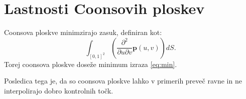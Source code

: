 \documentclass[a4paper,12pt]{article}
\begin{document}

\section{Lastnosti Coonsovih ploskev}

Coonsova ploskve minimzirajo zasuk, definiran kot:
\begin{equation}
   \label{eq:min}
   \int_{[0,1]^2} \left( \frac{\partial^2}{\partial u \partial v}\mathbf{p}(u,v) \right) dS.
\end{equation}
Torej coonsova ploskve doseže minimum izraza \eqref{eq:min}.

Posledica tega je, da so coonsova ploskve lahko v primerih preveč ravne in ne interpolirajo dobro kontrolnih točk.
\end{document}
